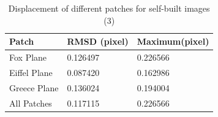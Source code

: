 \begin{table}[htbp]
	\centering
	\scriptsize  
	\begin{tabular}{p{80pt} p{60pt} p{60pt}}
	\toprule
	Patch & {\bfseries RMSD (pixel)} & {\bfseries Maximum(pixel)}\\ \midrule
	Fox Plane&  0.126497&0.226566 \\
	\addlinespace[3pt]
	Eiffel Plane  &  0.087420&0.162986\\
	\addlinespace[3pt]
	Greece Plane & 0.136024&0.194004 \\ 
	\addlinespace[3pt]
	All Patches & 0.117115&0.226566 \\ \bottomrule
	\end{tabular}
	\caption{Displacement of different patches for self-built images (3)}  
	\label{tab:Displacement of different patches for self-built images (3)} 
\end{table}

